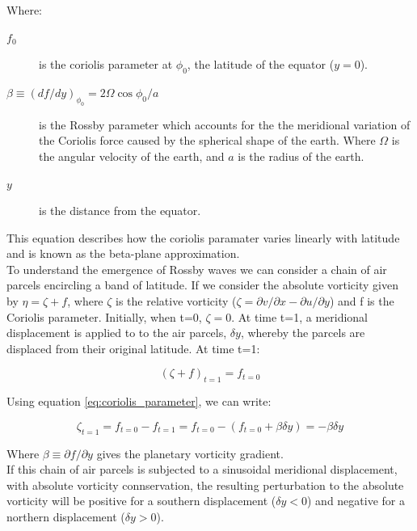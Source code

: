 \documentclass{article}
\begin{document}
Where:

\begin{description}
    \item[$f_0$] is the coriolis parameter at $\phi_0$, the latitude of the equator ($y=0$).
    \item[$\beta \equiv (df/dy)_{\phi_0} = 2 \Omega \cos{\phi_0/a}$]  is the Rossby parameter which accounts for the the meridional variation of the Coriolis force caused by the spherical shape of the earth. Where $\Omega$ is the angular velocity of the earth, and $a$ is the radius of the earth.
    \item[$y$] is the distance from the equator.
\end{description}

This equation describes how the coriolis paramater varies linearly with latitude and is known as the beta-plane approximation.\\

To understand the emergence of Rossby waves we can consider a chain of air parcels encircling a band of latitude. If we consider the absolute vorticity given by $\eta = \zeta + f$, where $\zeta$ is the relative vorticity ($\zeta = \partial v / \partial x - \partial u / \partial y$) and f is the Coriolis parameter. Initially, when t=0, $\zeta = 0$. At time t=1, a meridional displacement is applied to to the air parcels, $\delta y$, whereby the parcels are displaced from their original latitude. At time t=1:

\begin{equation}
    (\zeta + f)_{t=1} = f_{t=0}
    \label{eq:zeta}
\end{equation}

Using equation \ref{eq:coriolis_parameter}, we can write:

\begin{equation}
    \zeta_{t=1} = f_{t=0} - f_{t=1} = f_{t=0} - (f_{t=0} + \beta \delta y) = -\beta \delta y
    \label{eq:zeta_rearanged}
\end{equation}

Where $\beta \equiv \partial f/ \partial y$ gives the planetary vorticity gradient.\\


If this chain of air parcels is subjected to a sinusoidal meridional displacement, with absolute vorticity connservation, the resulting perturbation to the absolute vorticity will be positive for a southern displacement ($\delta y < 0$) and negative for a northern displacement ($\delta y > 0$).\\
\end{document}
